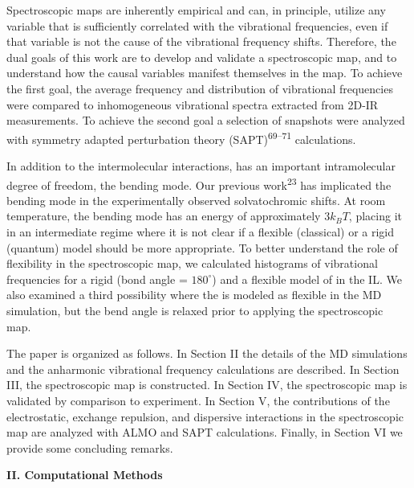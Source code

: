 \documentclass[]{article}
\begin{document}
Spectroscopic maps are inherently empirical and can, in principle, utilize any variable that is sufficiently correlated with the vibrational frequencies, even if that variable is not the cause of the vibrational frequency shifts. Therefore, the dual goals of this work are to develop and validate a spectroscopic map, and to understand how the causal variables manifest themselves in the map. To achieve the first goal, the average frequency and distribution of vibrational frequencies were compared to inhomogeneous vibrational spectra extracted from 2D-IR measurements. To achieve the second goal a selection of snapshots were analyzed with symmetry adapted perturbation theory (SAPT)\textsuperscript{69--71} calculations.

In addition to the intermolecular interactions,  has an important intramolecular degree of freedom, the bending mode. Our previous work\textsuperscript{23} has implicated the bending mode in the experimentally observed solvatochromic shifts. At room temperature, the bending mode has an energy of approximately \(3k_{B}T\), placing it in an intermediate regime where it is not clear if a flexible (classical) or a rigid (quantum) model should be more appropriate. To better understand the role of  flexibility in the spectroscopic map, we calculated histograms of vibrational frequencies for a rigid (bond angle = \(180^{\circ}\)) and a flexible model of  in the \ce{[C4C1im][PF6]} IL. We also examined a third possibility where the  is modeled as flexible in the MD simulation, but the bend angle is relaxed prior to applying the spectroscopic map.

The paper is organized as follows. In Section II the details of the MD simulations and the anharmonic vibrational frequency calculations are described. In Section III, the spectroscopic map is constructed. In Section IV, the spectroscopic map is validated by comparison to experiment. In Section V, the contributions of the electrostatic, exchange repulsion, and dispersive interactions in the spectroscopic map are analyzed with ALMO and SAPT calculations. Finally, in Section VI we provide some concluding remarks.

\textbf{II. Computational Methods}
\end{document}
